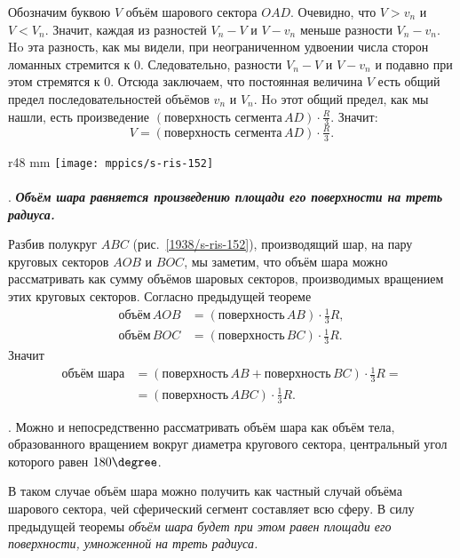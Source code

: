 Обозначим буквою $V$ объём шарового сектора $OAD$.
Очевидно, что $V>v_n$ и $V<V_n$.
Значит, каждая из разностей $V_n-V$ и $V-v_n$ меньше разности $V_n-v_n$.
Ho эта разность, как мы видели, при неограниченном удвоении числа сторон ломанных стремится к $0$. Следовательно, разности $V_n-V$ и $V-v_n$ и подавно при этом стремятся к $0$.
Отсюда заключаем, что постоянная величина $V$ есть общий предел последовательностей объёмов $v_n$ и $V_n$.
Ho этот общий предел, как мы нашли, есть произведение $(\text{поверхность сегмента}\,  AD)\cdot \tfrac R3$.
Значит:
\[V=(\text{поверхность сегмента}\,  AD)\cdot \tfrac R3.\]

\begin{wrapfigure}{r}{48 mm}
\vskip-0mm
\centering
\texttt{[image: mppics/s-ris-152]}
\caption{}\label{1938/s-ris-152}
\vskip-0mm
\end{wrapfigure}

\paragraph{}\label{1938/s144}
\mbox{.}
\textbf{\emph{Объём шара равняется произведению площади его поверхности на треть радиуса.}}

Разбив полукруг $ABC$ (рис.~\ref{1938/s-ris-152}), производящий шар, на пару круговых секторов $AOB$ и $BOC$, мы заметим, что объём шара можно рассматривать как сумму объёмов шаровых секторов, производимых вращением этих круговых секторов.
Согласно предыдущей теореме
\begin{align*}
\text{объём}\, AOB &= (\text{поверхность}\, AB)\cdot \tfrac13 R,
\\
\text{объём}\, BOC &= (\text{поверхность}\, BC) \cdot \tfrac13 R.
\end{align*}
Значит
\begin{align*}
\text{объём шара} &= (\text{поверхность}\, AB+\text{поверхность}\, BC)\cdot \tfrac13 R=
\\
&=(\text{поверхность}\, ABC)\cdot \tfrac13 R.
\end{align*}

\medskip

.
Можно и непосредственно рассматривать объём шара как объём тела, образованного вращением вокруг диаметра кругового сектора, центральный угол которого равен $180\degree$.

В таком случае объём шара можно получить как частный случай объёма шарового сектора, чей сферический сегмент составляет всю сферу.
В силу предыдущей теоремы \emph{объём шара будет при этом равен площади его поверхности, умноженной на треть радиуса.}

